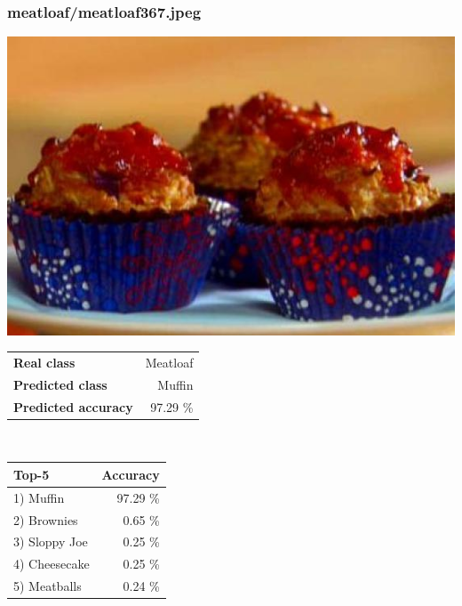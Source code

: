 \subsubsection{meatloaf/meatloaf367.jpeg}

\begin{minipage}[t]{0.4\textwidth}
	\vspace{0pt}
	\includegraphics[width=\linewidth]{images/evaluation-images/meatloaf/meatloaf367.jpeg}
\end{minipage}
\hfill
\begin{minipage}[t]{0.5\textwidth}
	\vspace{0pt}\raggedright
	\begin{tabularx}{\textwidth}{X r}
		\small \textbf{Real class} & \small Meatloaf\\
		\small \textbf{Predicted class} & \small Muffin\\
		\small \textbf{Predicted accuracy} & \small 97.29 \%
    \end{tabularx}\\
    
    \vspace{6pt}
	\begin{tabularx}{\textwidth}{X r}
        \small \textbf{Top-5} & \small \textbf{Accuracy} \\
        \hline
		\small 1) Muffin & \small 97.29 \%\\\small 2) Brownies & \small 0.65 \%\\\small 3) Sloppy Joe & \small 0.25 \%\\\small 4) Cheesecake & \small 0.25 \%\\\small 5) Meatballs & \small 0.24 \%
    \end{tabularx}
\end{minipage}
    
